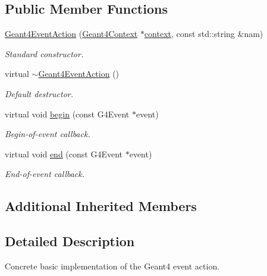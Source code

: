 \subsection*{Public Member Functions}
\begin{DoxyCompactItemize}
\item 
\hyperlink{class_d_d4hep_1_1_simulation_1_1_geant4_event_action_ab2184a5387f9034786261c376edb6723}{Geant4\+Event\+Action} (\hyperlink{class_d_d4hep_1_1_simulation_1_1_geant4_context}{Geant4\+Context} $\ast$\hyperlink{class_d_d4hep_1_1_simulation_1_1_geant4_action_aa9d87f0ec2a72b7fc2591b18f98d75cf}{context}, const std\+::string \&nam)
\begin{DoxyCompactList}\small\item\em Standard constructor. \end{DoxyCompactList}\item 
virtual \hyperlink{class_d_d4hep_1_1_simulation_1_1_geant4_event_action_aa9e00290e866cfe1f2f471ecdd069291}{$\sim$\+Geant4\+Event\+Action} ()
\begin{DoxyCompactList}\small\item\em Default destructor. \end{DoxyCompactList}\item 
virtual void \hyperlink{class_d_d4hep_1_1_simulation_1_1_geant4_event_action_ad10785d157fa962f4ef2a5361bb0f5da}{begin} (const G4\+Event $\ast$event)
\begin{DoxyCompactList}\small\item\em Begin-\/of-\/event callback. \end{DoxyCompactList}\item 
virtual void \hyperlink{class_d_d4hep_1_1_simulation_1_1_geant4_event_action_af131bad73c28da3419af7c29e0b8c250}{end} (const G4\+Event $\ast$event)
\begin{DoxyCompactList}\small\item\em End-\/of-\/event callback. \end{DoxyCompactList}\end{DoxyCompactItemize}
\subsection*{Additional Inherited Members}


\subsection{Detailed Description}
Concrete basic implementation of the Geant4 event action. 

